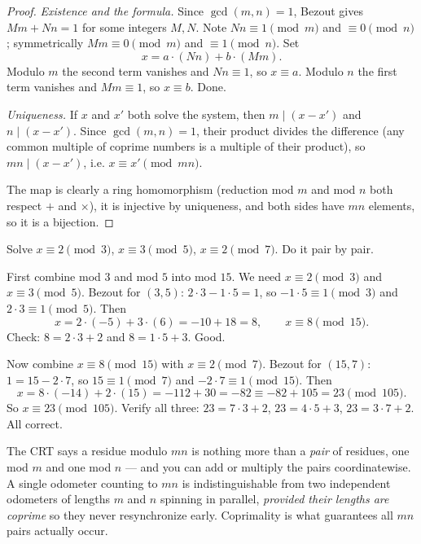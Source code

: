 \begin{proof}
\emph{Existence and the formula.} Since $\gcd(m, n) = 1$, Bezout gives $M m + N n = 1$ for some
integers $M, N$. Note $Nn \equiv 1 \pmod m$ and $\equiv 0 \pmod n$; symmetrically $Mm \equiv 0
\pmod m$ and $\equiv 1 \pmod n$. Set
\[
  x = a \cdot (Nn) + b \cdot (Mm).
\]
Modulo $m$ the second term vanishes and $Nn \equiv 1$, so $x \equiv a$. Modulo $n$ the first term
vanishes and $Mm \equiv 1$, so $x \equiv b$. Done.

\emph{Uniqueness.} If $x$ and $x'$ both solve the system, then $m \mid (x - x')$ and
$n \mid (x - x')$. Since $\gcd(m, n) = 1$, their product divides the difference (any common multiple
of coprime numbers is a multiple of their product), so $mn \mid (x - x')$, i.e. $x \equiv x' \pmod
{mn}$.

The map is clearly a ring homomorphism (reduction mod $m$ and mod $n$ both respect $+$ and
$\times$), it is injective by uniqueness, and both sides have $mn$ elements, so it is a bijection.
\end{proof}

\begin{example}
\label{ch04:ex-crt-sunzi}
Solve $x \equiv 2 \pmod 3$, $x \equiv 3 \pmod 5$, $x \equiv 2 \pmod 7$. Do it pair by pair.

First combine mod $3$ and mod $5$ into mod $15$. We need $x \equiv 2 \pmod 3$ and $x \equiv 3
\pmod 5$. Bezout for $(3,5)$: $2 \cdot 3 - 1 \cdot 5 = 1$, so $-1 \cdot 5 \equiv 1 \pmod 3$ and
$2 \cdot 3 \equiv 1 \pmod 5$. Then
\[
  x = 2 \cdot (-5) + 3 \cdot (6) = -10 + 18 = 8, \qquad x \equiv 8 \pmod{15}.
\]
Check: $8 = 2 \cdot 3 + 2$ and $8 = 1 \cdot 5 + 3$. Good.

Now combine $x \equiv 8 \pmod{15}$ with $x \equiv 2 \pmod 7$. Bezout for $(15, 7)$:
$1 = 15 - 2 \cdot 7$, so $15 \equiv 1 \pmod 7$ and $-2 \cdot 7 \equiv 1 \pmod{15}$. Then
\[
  x = 8 \cdot (-14) + 2 \cdot (15) = -112 + 30 = -82 \equiv -82 + 105 = 23 \pmod{105}.
\]
So $x \equiv 23 \pmod{105}$. Verify all three: $23 = 7\cdot3 + 2$, $23 = 4 \cdot 5 + 3$,
$23 = 3 \cdot 7 + 2$. All correct.
\end{example}

\begin{intuitionbox}
The CRT says a residue modulo $mn$ is nothing more than a \emph{pair} of residues, one mod $m$ and
one mod $n$ --- and you can add or multiply the pairs coordinatewise. A single odometer counting to
$mn$ is indistinguishable from two independent odometers of lengths $m$ and $n$ spinning in
parallel, \emph{provided their lengths are coprime} so they never resynchronize early. Coprimality
is what guarantees all $mn$ pairs actually occur.
\end{intuitionbox}

